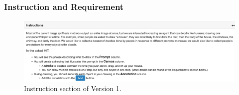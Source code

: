 \subsubsection{Instruction and Requirement}

\begin{figure}[!htb]    
\includegraphics[width=\linewidth]{data_collection/v1_instruction.png} 
\caption{Instruction section of Version 1.}
\label{v1.instruction}
\end{figure}

